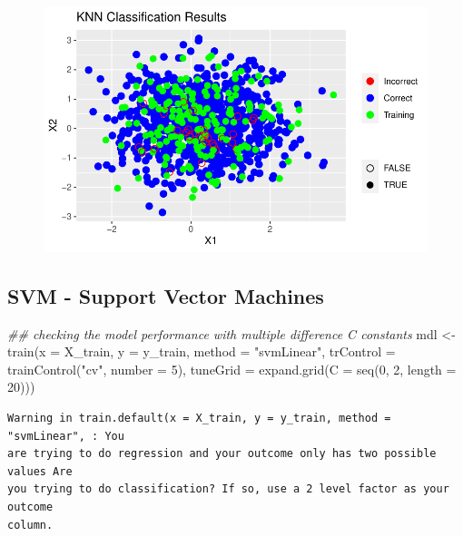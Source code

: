 \documentclass[
  letterpaper,
  DIV=11,
  numbers=noendperiod]{scrartcl}
\newenvironment{Shaded}{\begin{snugshade}}{\end{snugshade}}
\newcommand{\AttributeTok}[1]{\textcolor[rgb]{0.40,0.45,0.13}{#1}}
\newcommand{\DecValTok}[1]{\textcolor[rgb]{0.68,0.00,0.00}{#1}}
\newcommand{\DocumentationTok}[1]{\textcolor[rgb]{0.37,0.37,0.37}{\textit{#1}}}
\newcommand{\FunctionTok}[1]{\textcolor[rgb]{0.28,0.35,0.67}{#1}}
\newcommand{\NormalTok}[1]{\textcolor[rgb]{0.00,0.23,0.31}{#1}}
\newcommand{\OtherTok}[1]{\textcolor[rgb]{0.00,0.23,0.31}{#1}}
\newcommand{\StringTok}[1]{\textcolor[rgb]{0.13,0.47,0.30}{#1}}
\begin{document}
\begin{figure}[H]

{\centering \includegraphics{AssignmentAdvancedTopicsInStatistics_files/figure-pdf/unnamed-chunk-21-1.pdf}

}

\end{figure}

\hypertarget{svm---support-vector-machines}{%
\subsection{SVM - Support Vector
Machines}\label{svm---support-vector-machines}}

\begin{Shaded}
\begin{Highlighting}[]
\DocumentationTok{\#\# checking the model performance with multiple difference C constants}
\NormalTok{mdl }\OtherTok{\textless{}{-}} \FunctionTok{train}\NormalTok{(}\AttributeTok{x =}\NormalTok{ X\_train, }\AttributeTok{y =}\NormalTok{ y\_train, }\AttributeTok{method =} \StringTok{"svmLinear"}\NormalTok{, }\AttributeTok{trControl =} \FunctionTok{trainControl}\NormalTok{(}\StringTok{"cv"}\NormalTok{,}
    \AttributeTok{number =} \DecValTok{5}\NormalTok{), }\AttributeTok{tuneGrid =} \FunctionTok{expand.grid}\NormalTok{(}\AttributeTok{C =} \FunctionTok{seq}\NormalTok{(}\DecValTok{0}\NormalTok{, }\DecValTok{2}\NormalTok{, }\AttributeTok{length =} \DecValTok{20}\NormalTok{)))}
\end{Highlighting}
\end{Shaded}

\begin{verbatim}
Warning in train.default(x = X_train, y = y_train, method = "svmLinear", : You
are trying to do regression and your outcome only has two possible values Are
you trying to do classification? If so, use a 2 level factor as your outcome
column.
\end{verbatim}
\end{document}
